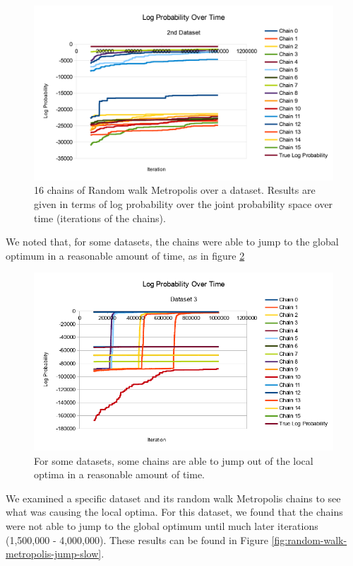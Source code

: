 \documentclass[runningheads]{llncs}
\begin{document}
\begin{figure}[t]
\begin{center}
   \includegraphics[width=0.8\linewidth]{figs/random-walk-metropolis-dataset-2.png}
\end{center}
   \caption{16 chains of Random walk Metropolis over a dataset. Results are 
        given in terms of log probability over the joint probability space over 
        time (iterations of the chains).}
\label{fig:random-walk-metropolis-dataset-2}
\end{figure}

We noted that, for some datasets, the chains were able to jump to the global 
optimum in a reasonable amount of time, as in figure \ref{fig:random-walk-metropolis-jump-quick}

\begin{figure}[t]
\begin{center}
   \includegraphics[width=0.8\linewidth]{figs/random-walk-metropolis-jump-quick.png}
\end{center}
   \caption{For some datasets, some chains are able to jump out of the local optima 
        in a reasonable amount of time.}
\label{fig:random-walk-metropolis-jump-quick}
\end{figure}

We examined a specific dataset and its random walk Metropolis chains to see what 
was causing the local optima. For this dataset, we found that the chains were 
not able to jump to the global optimum until much later iterations (1,500,000 - 4,000,000). 
These results can be found in Figure \ref{fig:random-walk-metropolis-jump-slow}.
\end{document}
